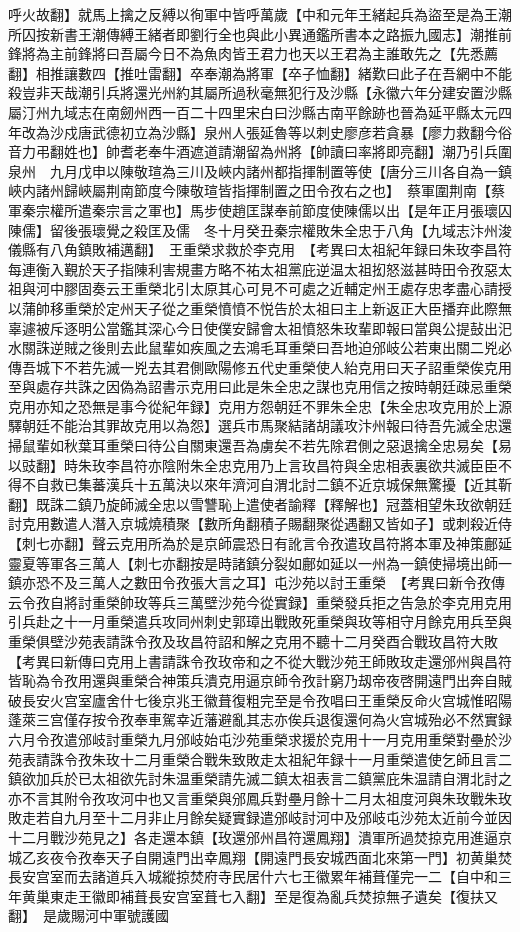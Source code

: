 呼火故翻】就馬上擒之反縛以徇軍中皆呼萬歲【中和元年王緒起兵為盜至是為王潮所囚按新書王潮傳縛王緒者即劉行全也與此小異通鑑所書本之路振九國志】潮推前鋒將為主前鋒將曰吾屬今日不為魚肉皆王君力也天以王君為主誰敢先之【先悉薦翻】相推讓數四【推吐雷翻】卒奉潮為將軍【卒子恤翻】緒歎曰此子在吾網中不能殺豈非天哉潮引兵將還光州約其屬所過秋毫無犯行及沙縣【永徽六年分建安置沙縣屬汀州九域志在南劒州西一百二十四里宋白曰沙縣古南平餘跡也晉為延平縣太元四年改為沙戍唐武德初立為沙縣】泉州人張延魯等以刺史廖彦若貪暴【廖力救翻今俗音力弔翻姓也】帥耆老奉牛酒遮道請潮留為州將【帥讀曰率將即亮翻】潮乃引兵圍泉州　九月戊申以陳敬瑄為三川及峽内諸州都指揮制置等使【唐分三川各自為一鎮峽内諸州歸峽屬荆南節度今陳敬瑄皆指揮制置之田令孜右之也】　蔡軍圍荆南【蔡軍秦宗權所遣秦宗言之軍也】馬步使趙匡謀奉前節度使陳儒以出【是年正月張瓌囚陳儒】留後張瓌覺之殺匡及儒　冬十月癸丑秦宗權敗朱全忠于八角【九域志汴州浚儀縣有八角鎮敗補邁翻】　王重榮求救於李克用　【考異曰太祖紀年録曰朱玫李昌符每連衡入覲於天子指陳利害規畫方略不祐太祖黨庇逆温太祖抝怒滋甚時田令孜惡太祖與河中膠固奏云王重榮北引太原其心可見不可處之近輔定州王處存忠孝盡心請授以蒲帥移重榮於定州天子從之重榮憤憤不悦告於太祖曰主上新返正大臣播弃此際無辜遽被斥逐明公當鑑其深心今日使僕安歸會太祖憤怒朱玫輩即報曰當與公提鼔出汜水關誅逆賊之後則去此鼠輩如疾風之去鴻毛耳重榮曰吾地迫邠岐公若東出關二兇必傳吾城下不若先滅一兇去其君側歐陽修五代史重榮使人紿克用曰天子詔重榮俟克用至與處存共誅之因偽為詔書示克用曰此是朱全忠之謀也克用信之按時朝廷疎忌重榮克用亦知之恐無是事今從紀年録】克用方怨朝廷不罪朱全忠【朱全忠攻克用於上源驛朝廷不能治其罪故克用以為怨】選兵市馬聚結諸胡議攻汴州報曰待吾先滅全忠還掃鼠輩如秋葉耳重榮曰待公自關東還吾為虜矣不若先除君側之惡退擒全忠易矣【易以豉翻】時朱玫李昌符亦陰附朱全忠克用乃上言玫昌符與全忠相表裏欲共滅臣臣不得不自救已集蕃漢兵十五萬決以來年濟河自渭北討二鎮不近京城保無驚擾【近其靳翻】既誅二鎮乃旋師滅全忠以雪讐恥上遣使者諭釋【釋解也】冠蓋相望朱玫欲朝廷討克用數遣人潛入京城燒積聚【數所角翻積子賜翻聚從遇翻又皆如子】或刺殺近侍【刺七亦翻】聲云克用所為於是京師震恐日有訛言令孜遣玫昌符將本軍及神策鄜延靈夏等軍各三萬人【刺七亦翻按是時諸鎮分裂如鄜如延以一州為一鎮使掃境出師一鎮亦恐不及三萬人之數田令孜張大言之耳】屯沙苑以討王重榮　【考異曰新令孜傳云令孜自將討重榮帥玫等兵三萬壁沙苑今從實録】重榮發兵拒之告急於李克用克用引兵赴之十一月重榮遣兵攻同州刺史郭璋出戰敗死重榮與玫等相守月餘克用兵至與重榮俱壁沙苑表請誅令孜及玫昌符詔和解之克用不聽十二月癸酉合戰玫昌符大敗　【考異曰新傳曰克用上書請誅令孜玫帝和之不從大戰沙苑王師敗玫走還邠州與昌符皆恥為令孜用還與重榮合神策兵潰克用逼京師令孜計窮乃刼帝夜啓開遠門出奔自賊破長安火宫室廬舍什七後京兆王徽葺復粗完至是令孜唱曰王重榮反命火宫城惟昭陽蓬萊三宫僅存按令孜奉車駕幸近藩避亂其志亦俟兵退復還何為火宫城殆必不然實録六月令孜遣邠岐討重榮九月邠岐始屯沙苑重榮求援於克用十一月克用重榮對壘於沙苑表請誅令孜朱玫十二月重榮合戰朱致敗走太祖紀年録十一月重榮遣使乞師且言二鎮欲加兵於已太祖欲先討朱温重榮請先滅二鎮太祖表言二鎮黨庇朱温請自渭北討之亦不言其附令孜攻河中也又言重榮與邠鳳兵對壘月餘十二月太祖度河與朱玫戰朱玫敗走若自九月至十二月非止月餘矣疑實録遣邠岐討河中及邠岐屯沙苑太近前今並因十二月戰沙苑見之】各走還本鎮【玫還邠州昌符還鳳翔】潰軍所過焚掠克用進逼京城乙亥夜令孜奉天子自開遠門出幸鳳翔【開遠門長安城西面北來第一門】初黄巢焚長安宫室而去諸道兵入城縱掠焚府寺民居什六七王徽累年補葺僅完一二【自中和三年黄巢東走王徽即補葺長安宫室葺七入翻】至是復為亂兵焚掠無孑遺矣【復扶又翻】　是歲賜河中軍號護國

